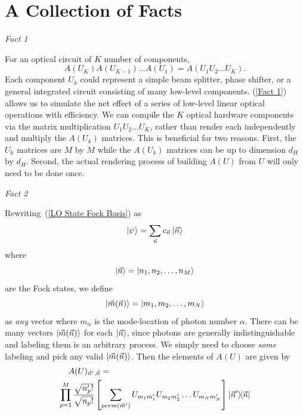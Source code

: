 \documentclass[aps,pra,twocolumn,showpacs,superscriptaddress,floatfix,10pt]{revtex4}
\begin{document}
\section{A Collection of Facts}
\label{Section of Facts}
\begin{center}\textit{Fact 1} \end{center}
For an optical circuit of $K$ number of components,
\begin{equation}
	\label{Fact 1}
A(U_K) A(U_{K-1}) \dots A(U_1) = A(U_1 U_2 \dots U_K).
\end{equation}
Each component $U_k$ could represent a simple beam splitter, phase shifter, or a general integrated circuit consisting of many low-level components.
(\ref{Fact 1}) allows us to simulate the net effect of a series of low-level linear optical operations with efficiency. We can compile the $K$ optical hardware components via the matrix multiplication $U_1 U_2 \dots U_K$, rather than render each independently and multiply the $A(U_k)$ matrices. This is beneficial for two reasons. First, the $U_k$ matrices are $M$ by $M$ while the $A(U_k)$ matrices can be up to dimension $d_H$ by $d_H$. Second, the actual rendering process of building $A(U)$ from $U$ will only need to be done once.
\newpage
\begin{center}\textit{Fact 2} \end{center}
Rewriting~(\ref{LO State Fock Basis}) as
\begin{equation}
\label{LO State Fock Vec Basis}
\ket{\psi} = \sum_{\vec{n}} c_{\vec{n}} \ket{\vec{n}}
\end{equation}
where
\begin{equation}
\ket{\vec{n}} = \ket{n_1,n_2,\dots,n_M}
\end{equation}
are the Fock states, we define
\begin{equation}
\label{m definition}
\ket{\vec{m}(\vec{n})} = \ket{m_1,m_2,\dots,m_N}
\end{equation}
as \textit{any} vector where $m_\alpha$ is the mode-location of photon number $\alpha$. There can be many vectors $\ket{\vec{m}(\vec{n})}$ for each $\ket{\vec{n}}$, since photons are generally indistinguishable and labeling them is an arbitrary process. We simply need to choose \textit{some} labeling and pick any valid $\ket{\vec{m}(\vec{n})}$. Then the elements of $A(U)$ are given by
\begin{eqnarray}
\label{Fact 2}
A(U)_{\vec{n}^\prime,\vec{n}} = \quad \quad \quad \quad \quad \quad \quad \quad \quad \quad \quad \quad \quad \quad \quad \quad \quad \\ \small \nonumber \prod_{p=1}^{M} \frac{\sqrt{n_p^\prime !}}{\sqrt{n_p !}} \left[\sum_{perm(\vec{m}^\prime)} U_{m_1 m_1^\prime} U_{m_2 m_2^\prime} \dots U_{m_N m_N^\prime} \right] \outerproduct{\vec{n}^\prime}{\vec{n}} 
\end{eqnarray}
\end{document}
